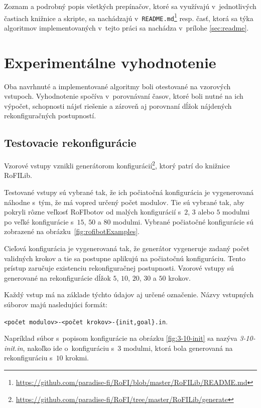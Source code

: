 \documentclass[
  printed, %
  oneside, %
  notable,   %
  nolof,     %
  nolot,     %
]{fithesis3}
\begin{document}
Zoznam a podrobný popis všetkých prepínačov, ktoré sa využívajú v~jednotlivých častiach knižnice a skripte, sa nachádzajú v~\texttt{README.md}\footnote{\url{https://github.com/paradise-fi/RoFI/blob/master/RoFILib/README.md}} resp. časť, ktorá sa týka algoritmov implementovaných v~tejto práci sa nachádza v~prílohe \ref{sec:readme}. 





\chapter{Experimentálne vyhodnotenie}
Oba navrhnuté a implementované algoritmy boli otestované na vzorových vstupoch. Vyhodnotenie spočíva v~porovnávaní časov, ktoré boli nutné na ich výpočet, schopnosti nájsť riešenie a zároveň aj porovnaní dĺžok nájdených rekonfiguračných postupností. 

\section{Testovacie rekonfigurácie}
Vzorové vstupy vznikli generátorom konfigurácií\footnote{\url{https://github.com/paradise-fi/RoFI/tree/master/RoFILib/generate}}, ktorý patrí do knižnice RoFILib. 

Testované vstupy sú vybrané tak, že ich počiatočná konfigurácia je vygenerovaná náhodne s~tým, že má vopred určený počet modulov. Tie sú vybrané tak, aby pokryli rôzne veľkosť RoFIbotov od malých konfigurácií s~$2$, $3$ alebo $5$ modulmi po veľké konfigurácie s~$15$, $50$ a $80$ modulmi. Vybrané počiatočné konfigurácie sú zobrazené na obrázku~\ref{fig:rofibotExamples}. 

Cieľová konfigurácia je vygenerovaná tak, že generátor vygeneruje zadaný počet validných krokov a tie sa postupne aplikujú na počiatočnú konfiguráciu. Tento prístup zaručuje existenciu rekonfiguračnej postupnosti. Vzorové vstupy sú generované na rekonfigurácie dĺžok $5$, $10$, $20$, $30$ a $50$ krokov. 

Každý vstup má na základe týchto údajov aj určené označenie. Názvy vstupných súborov majú nasledujúci formát:

\texttt{<počet modulov>-<počet krokov>-\{init,goal\}.in}. 

Napríklad súbor s~popisom konfigurácie na obrázku \ref{fig:3-10-init} sa nazýva \textit{3-10-init.in}, nakoľko ide o~konfiguráciu s~$3$ modulmi, ktorá bola generovaná na rekonfiguráciu s~$10$ krokmi. 
\end{document}
